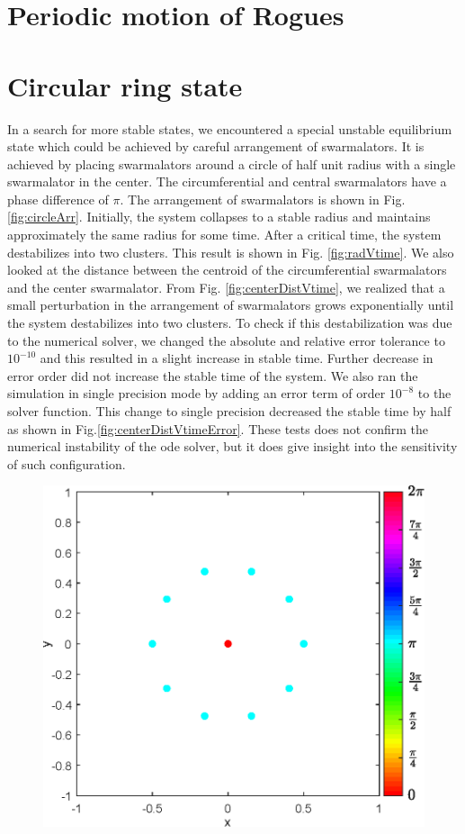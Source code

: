 \documentclass[twocolumn,10pt]{asme2ej}
\begin{document}
\section{Periodic motion of Rogues}

\section{Circular ring state}
{
    In a search for more stable states, we encountered a special unstable equilibrium state which could be achieved by careful arrangement of swarmalators. It is achieved by placing swarmalators around a circle of half unit radius with a single swarmalator in the center. The circumferential and central swarmalators have a phase difference of \(\pi\). The arrangement of swarmalators is shown in Fig. \ref{fig:circleArr}. Initially, the system collapses to a stable radius and maintains approximately the same radius for some time. After a critical time, the system destabilizes into two clusters. This result is shown in Fig. \ref{fig:radVtime}. We also looked at the distance between the centroid of the circumferential swarmalators and the center swarmalator. From Fig. \ref{fig:centerDistVtime}, we realized that a small perturbation in the arrangement of swarmalators grows exponentially until the system destabilizes into two clusters. To check if this destabilization was due to the numerical solver, we changed the absolute and relative error tolerance to \(10^{-10}\) and this resulted in a slight increase in stable time. Further decrease in error order did not increase the stable time of the system. We also ran the simulation in single precision mode by adding an error term of order \(10^{-8}\) to the solver function. This change to single precision decreased the stable time by half as shown in Fig.\ref{fig:centerDistVtimeError}. These tests does not confirm the numerical instability of the ode solver, but it does give insight into the sensitivity of such configuration. 
    \begin{figure}[h!]
        \includegraphics[width = \linewidth]{circleArrangment.eps}

\end{figure}}
\end{document}
